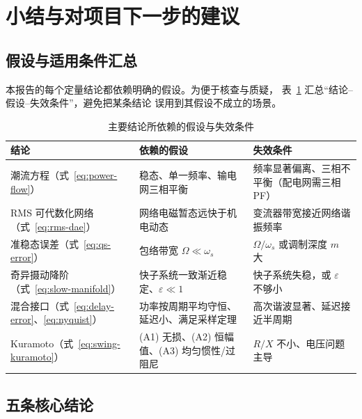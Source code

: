 \section{小结与对项目下一步的建议}
\label{sec:summary}

\subsection{假设与适用条件汇总}

本报告的每个定量结论都依赖明确的假设。为便于核查与质疑，
表~\ref{tab:assumptions} 汇总“结论--假设--失效条件”，避免把某条结论
误用到其假设不成立的场景。

\begin{table}[htbp]
\centering
\caption{主要结论所依赖的假设与失效条件}
\label{tab:assumptions}
\small
\begin{tabularx}{\textwidth}{@{}lXX@{}}
\toprule
结论 & 依赖的假设 & 失效条件 \\
\midrule
潮流方程（式~\eqref{eq:power-flow}） & 稳态、单一频率、输电网三相平衡 &
频率显著偏离、三相不平衡（配电网需三相 PF） \\
RMS 可代数化网络（式~\eqref{eq:rms-dae}） & 网络电磁暂态远快于机电动态 &
变流器带宽接近网络谐振频率 \\
准稳态误差（式~\eqref{eq:qs-error}） & 包络带宽 $\Omega\ll\omega_s$ &
$\Omega/\omega_s$ 或调制深度 $m$ 大 \\
奇异摄动降阶（式~\eqref{eq:slow-manifold}） & 快子系统一致渐近稳定、$\varepsilon\ll1$ &
快子系统失稳，或 $\varepsilon$ 不够小 \\
混合接口（式~\eqref{eq:delay-error}、\eqref{eq:nyquist}） &
功率按周期平均守恒、延迟小、满足采样定理 & 高次谐波显著、延迟接近半周期 \\
Kuramoto（式~\eqref{eq:swing-kuramoto}） &
(A1) 无损、(A2) 恒幅值、(A3) 均匀惯性/过阻尼 & $R/X$ 不小、电压问题主导 \\
\bottomrule
\end{tabularx}
\end{table}

\subsection{五条核心结论}

